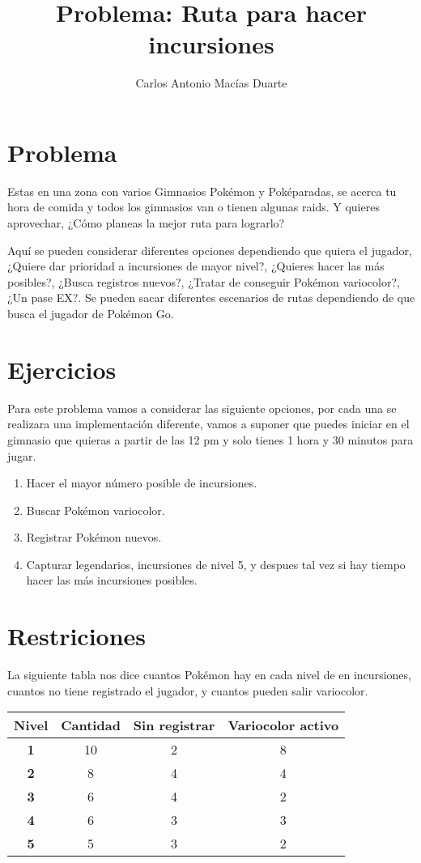 \documentclass[10pt,letterpaper,twoside,openright]{article}
\author{Carlos Antonio Macías Duarte}
\title{Problema: Ruta para hacer incursiones}
\begin{document}
	\maketitle
		
	\section{Problema}
	
		Estas en una zona con varios Gimnasios Pokémon y Poképaradas, se acerca tu hora de comida y todos los gimnasios van o tienen algunas raids. Y quieres aprovechar, ¿Cómo planeas la mejor ruta para lograrlo?
		
		Aquí se pueden considerar diferentes opciones dependiendo que quiera el jugador, ¿Quiere dar prioridad a incursiones de mayor nivel?, ¿Quieres hacer las más posibles?, ¿Busca registros nuevos?, ¿Tratar de conseguir Pokémon variocolor?, ¿Un pase EX?. Se pueden sacar diferentes escenarios de rutas dependiendo de que busca el jugador de Pokémon Go.
		
	\section{Ejercicios}
	
		Para este problema vamos a considerar las siguiente opciones, por cada una se realizara una implementación diferente, vamos a suponer que puedes iniciar en el gimnasio que quieras a partir de las 12 pm y solo tienes 1 hora y 30 minutos para jugar.
		
		
		\begin{enumerate}
			\item Hacer el mayor número posible de incursiones.
			\item Buscar Pokémon variocolor.
			\item Registrar Pokémon nuevos.
			\item Capturar legendarios, incursiones de nivel 5, y despues tal vez si hay tiempo hacer las más incursiones posibles.
		\end{enumerate}
		
	\section{Restriciones}
	
	La siguiente tabla nos dice cuantos Pokémon hay en cada nivel de en incursiones, cuantos no tiene registrado el jugador, y cuantos pueden salir variocolor.
	
	\begin{tabular}{c||ccc} 
	\textbf{Nivel} & \textbf{Cantidad} & \textbf{Sin registrar} & \textbf{Variocolor activ}o \\ 
	\hline 
	\textbf{1} & 10 & 2 & 8 \\ 
	\hline 
	\textbf{2} & 8 & 4 & 4 \\ 
	\hline 
	\textbf{3} & 6 & 4 & 2 \\ 
	\hline 
	\textbf{4} & 6 & 3 & 3 \\ 
	\hline 
	\textbf{5} & 5 & 3 & 2 \\ 
	\hline 
	\end{tabular} 
	
\end{document}
